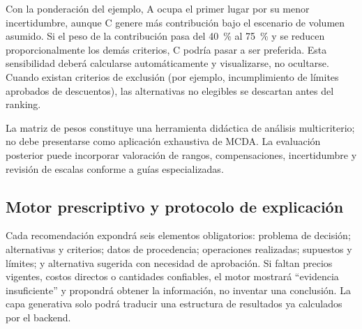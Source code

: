 Con la ponderación del ejemplo, A ocupa el primer lugar por su menor incertidumbre, aunque C genere más contribución bajo el escenario de volumen asumido. Si el peso de la contribución pasa del 40~\% al 75~\% y se reducen proporcionalmente los demás criterios, C podría pasar a ser preferida. Esta sensibilidad deberá calcularse automáticamente y visualizarse, no ocultarse. Cuando existan criterios de exclusión (por ejemplo, incumplimiento de límites aprobados de descuentos), las alternativas no elegibles se descartan antes del ranking.


La matriz de pesos constituye una herramienta didáctica de análisis multicriterio; no debe presentarse como aplicación exhaustiva de MCDA. La evaluación posterior puede incorporar valoración de rangos, compensaciones, incertidumbre y revisión de escalas conforme a guías especializadas.


\subsection{Motor prescriptivo y protocolo de explicación}

Cada recomendación expondrá seis elementos obligatorios: problema de decisión; alternativas y criterios; datos de procedencia; operaciones realizadas; supuestos y límites; y alternativa sugerida con necesidad de aprobación. Si faltan precios vigentes, costos directos o cantidades confiables, el motor mostrará “evidencia insuficiente” y propondrá obtener la información, no inventar una conclusión. La capa generativa solo podrá traducir una estructura de resultados ya calculados por el backend.



